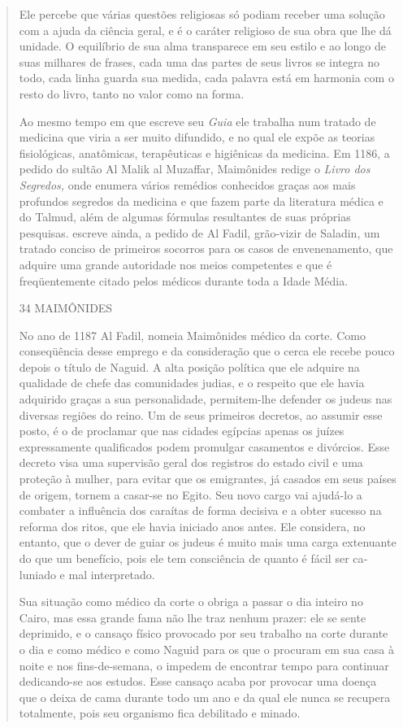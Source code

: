 \begin{quote}
Ele percebe que várias questões religiosas só podiam receber uma solução
com a ajuda da ciência geral, e é o caráter religioso de sua obra que
lhe dá unidade. O equilíbrio de sua alma transparece em seu estilo e ao
longo de suas milhares de frases, cada uma das partes de seus livros se
integra no to­do, cada linha guarda sua medida, cada palavra está em
harmonia com o resto do livro, tanto no valor como na forma.

Ao mesmo tempo em que escreve seu \emph{Guia} ele trabalha num trata­do
de medicina que viria a ser muito difundido, e no qual ele expõe as
teorias fisiológicas, anatômicas, terapêuticas e higiênicas da medicina.
Em 1186, a pe­dido do sultão Al Malik al Muzaffar, Maimônides redige o
\emph{Livro dos Segredos,} onde enumera vários remédios conhecidos
graças aos mais profundos segre­dos da medicina e que fazem parte da
literatura médica e do Talmud, além de algumas fórmulas resultantes de
suas próprias pesquisas. escreve ainda, a pedi­do de Al Fadil,
grão-vizir de Saladin, um tratado conciso de primeiros socorros para os
casos de envenenamento, que adquire uma grande autoridade nos meios
competentes e que é freqüentemente citado pelos médicos durante toda a
Ida­de Média.

34 MAIMÔNIDES

No ano de 1187 Al Fadil, nomeia Maimônides médico da corte. Co­mo
conseqüência desse emprego e da consideração que o cerca ele recebe
pouco depois o título de Naguid. A alta posição política que ele adquire
na qualidade de chefe das comunidades judias, e o respeito que ele havia
adquirido graças a sua personalidade, permitem-lhe defender os judeus
nas diversas regiões do reino. Um de seus primeiros decretos, ao assumir
esse posto, é o de proclamar que nas cidades egípcias apenas os juízes
expressamente qualificados podem promulgar casamentos e divórcios. Esse
decreto visa uma supervisão geral dos registros do estado civil e uma
proteção à mulher, para evitar que os emigran­tes, já casados em seus
países de origem, tornem a casar-se no Egito. Seu novo cargo vai
ajudá-lo a combater a influência dos caraítas de forma decisiva e a
obter sucesso na reforma dos ritos, que ele havia iniciado anos antes.
Ele consi­dera, no entanto, que o dever de guiar os judeus é muito mais
uma carga exte­nuante do que um benefício, pois ele tem consciência de
quanto é fácil ser ca­luniado e mal interpretado.

Sua situação como médico da corte o obriga a passar o dia inteiro no
Cairo, mas essa grande fama não lhe traz nenhum prazer: ele se sente
depri­mido, e o cansaço físico provocado por seu trabalho na corte
durante o dia e como médico e como Naguid para os que o procuram em sua
casa à noite e nos fins-de-semana, o impedem de encontrar tempo para
continuar dedican­do-se aos estudos. Esse cansaço acaba por provocar uma
doença que o deixa de cama durante todo um ano e da qual ele nunca se
recupera totalmente, pois seu organismo fica debilitado e minado.


\end{quote}
